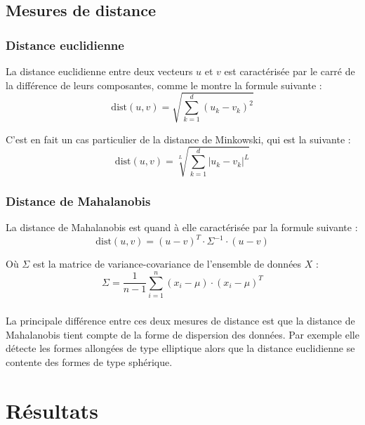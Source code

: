 \documentclass[french]{report}
\begin{document}
    \section{Mesures de distance}
    
    \subsection{Distance euclidienne}
    La distance euclidienne entre deux vecteurs $u$ et $v$ est caractérisée par le carré de la différence de leurs composantes, comme le montre la formule suivante :
    \begin{equation}
        \mathrm{dist}(u,v)=\sqrt{\sum_{k=1}^d(u_k-v_k)^2}
    \end{equation}
    
    \noindent C'est en fait un cas particulier de la distance de Minkowski, qui est la suivante :
    \begin{equation}
        \mathrm{dist}(u,v)=\sqrt[L]{\sum_{k=1}^d|u_k-v_k|^L}
    \end{equation}
    
    
    \subsection{Distance de Mahalanobis}
    La distance de Mahalanobis est quand à elle caractérisée par la formule suivante :
    \begin{equation}
        \mathrm{dist}(u,v)=(u-v)^T\cdot\Sigma^{-1}\cdot(u-v)
    \end{equation}
    
    \noindent Où $\Sigma$ est la matrice de variance-covariance de l'ensemble de données $X$ :
    \begin{equation}
        \Sigma=\frac1{n-1}\sum_{i=1}^n(x_i-\mu)\cdot(x_i-\mu)^T
    \end{equation}
    
    \paragraph{}
    La principale différence entre ces deux mesures de distance est que la distance de Mahalanobis tient compte de la forme de dispersion des données.
    Par exemple elle détecte les formes allongées de type elliptique alors que la distance euclidienne se contente des formes de type sphérique.
    
    \chapter{Résultats}
    
\end{document}

